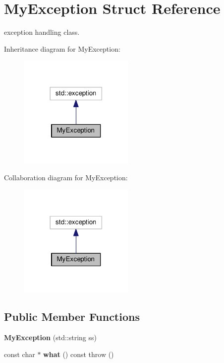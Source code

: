 \hypertarget{structMyException}{}\section{My\+Exception Struct Reference}
\label{structMyException}


exception handling class.  




Inheritance diagram for My\+Exception\+:\nopagebreak
\begin{figure}[H]
\begin{center}
\leavevmode
\includegraphics[width=158pt]{structMyException__inherit__graph}
\end{center}
\end{figure}


Collaboration diagram for My\+Exception\+:\nopagebreak
\begin{figure}[H]
\begin{center}
\leavevmode
\includegraphics[width=158pt]{structMyException__coll__graph}
\end{center}
\end{figure}
\subsection*{Public Member Functions}
\begin{DoxyCompactItemize}
\item 
\mbox{\label{structMyException_ad71a4be73b05417e6ac5ebdd44bb02ac}} 
{\bfseries My\+Exception} (std\+::string ss)
\item 
\mbox{\label{structMyException_ae4760fb255c8fafae1e8307642172d90}} 
const char $\ast$ {\bfseries what} () const  throw ()
\end{DoxyCompactItemize}
